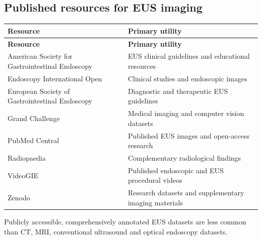 \subsection{Published resources for EUS imaging}
\begin{longtable}{@{}p{}p{}@{}}
\toprule
\textbf{Resource} & \textbf{Primary utility} \\
\midrule
\endfirsthead
\toprule
\textbf{Resource} & \textbf{Primary utility} \\
\midrule
\endhead
American Society for Gastrointestinal Endoscopy & EUS clinical guidelines and educational resources \\
Endoscopy International Open & Clinical studies and endoscopic images \\
European Society of Gastrointestinal Endoscopy & Diagnostic and therapeutic EUS guidelines \\
Grand Challenge & Medical imaging and computer vision datasets \\
PubMed Central & Published EUS images and open-access research \\
Radiopaedia & Complementary radiological findings \\
VideoGIE & Published endoscopic and EUS procedural videos \\
Zenodo & Research datasets and supplementary imaging materials \\
\bottomrule
\end{longtable}
Publicly accessible, comprehensively annotated EUS datasets are less common than CT, MRI, conventional ultrasound and optical endoscopy datasets.

